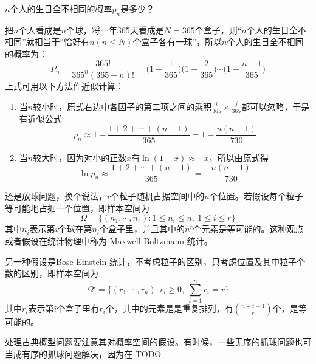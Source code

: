 \begin{example}[生日问题]
   $n$个人的生日全不相同的概率$p_n$是多少？
\end{example}
\begin{solution}
    把$n$个人看成是$n$个球，将一年365天看成是$N=365$个盒子，则“$n$个人的生日全不相同”就相当于“恰好有$n (n \le N)$个盒子各有一球”，所以$n$个人的生日全不相同的概率为：
    \[ P_n = \frac{365!}{365^n (365 - n)!} = \biggl(1 - \frac1{365}\biggr) \biggl(1 - \frac{2}{365}\biggr) \dotsb \biggl(1 - \frac{n - 1}{365}\biggr) \]
    上式可用以下方法作近似计算：
    \begin{enumerate}
        \item 当$n$较小时，原式右边中各因子的第二项之间的乘积$\frac{i}{365} \times \frac{j}{365}$都可以忽略，于是有近似公式
              \[ p_n \approx 1 - \frac{1 + 2 + \dotsb + (n - 1)}{365}  = 1 - \frac{n (n - 1)}{730}\]
        \item 当$n$较大时，因为对小的正数$x$有$\ln (1-x) \approx -x$，所以由原式得
              \[ \ln p_n \approx \frac{1 + 2 + \dotsb + (n - 1)}{365} = -\frac{n (n - 1)}{730}\]
    \end{enumerate}
\end{solution}

\begin{example}
    还是放球问题，换个说法，$r$个粒子随机占据空间中的$n$个位置。若假设每个粒子等可能地占据一个位置，即样本空间为
    \[ \Omega= \{(n_1, \cdots ,n_r):1 \le n_i \le n ,\ 1 \le i \le r\} \]
    其中$n_i$表示第$i$个球在第$n_i$个盒子里，并且其中的$n^r$个元素是等可能的。这种观点或者假设在统计物理中称为 Maxwell-Boltzmann 统计。

    另一种假设是Bose-Einstein 统计，不考虑粒子的区别，只考虑位置及其中粒子个数的区别，即样本空间为
    \[ \Omega'= \{(r_1, \cdots ,r_n): r_i\ge 0 ,\ \sum_{i=1}^n r_i = r\} \]
    其中$r_i$表示第$i$个盒子里有$r_i$个，其中的元素是是重复排列，有$\binom{n+t-1}{r}$个，是等可能的。
\end{example}

处理古典概型问题要注意其对概率空间的假设。有时候，一些无序的抓球问题也可当成有序的抓球问题解决，因为在
TODO

